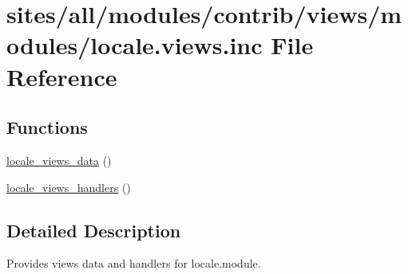 \hypertarget{locale_8views_8inc}{
\section{sites/all/modules/contrib/views/modules/locale.views.inc File Reference}
\label{locale_8views_8inc}
}
\subsection*{Functions}
\begin{CompactItemize}
\item 
\hyperlink{group__views__locale__module_ga2e7c82021bc70c0e3842e8430318690}{locale\_\-views\_\-data} ()
\item 
\hyperlink{group__views__locale__module_g7fbf99e477b576fce39857cf869b3631}{locale\_\-views\_\-handlers} ()
\end{CompactItemize}


\subsection{Detailed Description}
Provides views data and handlers for locale.module. 